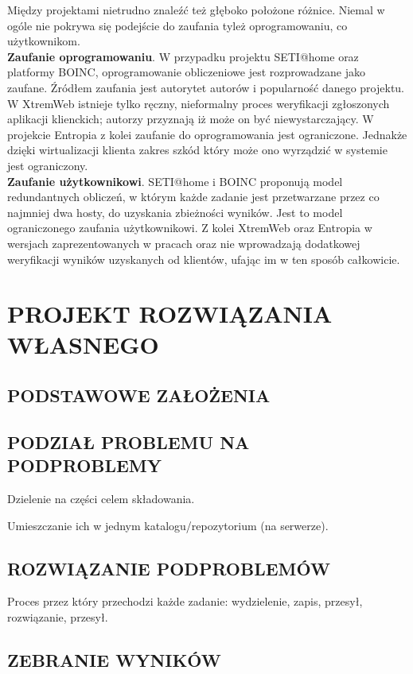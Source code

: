 \documentclass[12pt,a4paper,twoside]{article}
\begin{document}
Między projektami nietrudno znaleźć też głęboko położone różnice. Niemal w ogóle nie pokrywa się podejście do zaufania tyleż oprogramowaniu, co użytkownikom.\\
\textbf{Zaufanie oprogramowaniu}. W przypadku projektu SETI@home oraz platformy BOINC, oprogramowanie obliczeniowe jest rozprowadzane jako zaufane. Źródłem zaufania jest autorytet autorów i popularność danego projektu. W XtremWeb istnieje tylko ręczny, nieformalny proces weryfikacji zgłoszonych aplikacji klienckich; autorzy przyznają \cite{xtremweb} iż może on być niewystarczający. W projekcie Entropia z kolei zaufanie do oprogramowania jest ograniczone. Jednakże dzięki wirtualizacji klienta zakres szkód który może ono wyrządzić w systemie jest ograniczony. \\
\textbf{Zaufanie użytkownikowi}. SETI@home i BOINC proponują model redundantnych obliczeń, w którym każde zadanie jest przetwarzane przez co najmniej dwa hosty, do uzyskania zbieżności wyników. Jest to model ograniczonego zaufania użytkownikowi. Z kolei XtremWeb oraz Entropia w wersjach zaprezentowanych w pracach \cite{entropia} oraz \cite{xtremweb} nie wprowadzają dodatkowej weryfikacji wyników uzyskanych od klientów, ufając im w ten sposób całkowicie.

\section{PROJEKT ROZWIĄZANIA WŁASNEGO}

\subsection{PODSTAWOWE ZAŁOŻENIA}

\subsection{PODZIAŁ PROBLEMU NA PODPROBLEMY}

Dzielenie na części celem składowania. 

Umieszczanie ich w jednym katalogu/repozytorium (na serwerze).

\subsection{ROZWIĄZANIE PODPROBLEMÓW}

Proces przez który przechodzi każde zadanie: wydzielenie, zapis, przesył, rozwiązanie, przesył.

\subsection{ZEBRANIE WYNIKÓW}
\end{document}
